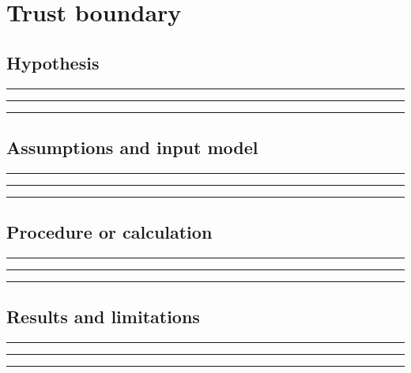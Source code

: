 \documentclass[11pt]{article}
\begin{document}
\section{Trust boundary}

\subsection{Hypothesis}
\noindent\rule{\linewidth}{0.35pt}\par\vspace{0.22in}
\noindent\rule{\linewidth}{0.35pt}\par\vspace{0.22in}
\noindent\rule{\linewidth}{0.35pt}\par\vspace{0.18in}

\subsection{Assumptions and input model}
\noindent\rule{\linewidth}{0.35pt}\par\vspace{0.22in}
\noindent\rule{\linewidth}{0.35pt}\par\vspace{0.22in}
\noindent\rule{\linewidth}{0.35pt}\par\vspace{0.18in}

\subsection{Procedure or calculation}
\noindent\rule{\linewidth}{0.35pt}\par\vspace{0.22in}
\noindent\rule{\linewidth}{0.35pt}\par\vspace{0.22in}
\noindent\rule{\linewidth}{0.35pt}\par\vspace{0.18in}

\subsection{Results and limitations}
\noindent\rule{\linewidth}{0.35pt}\par\vspace{0.22in}
\noindent\rule{\linewidth}{0.35pt}\par\vspace{0.22in}
\noindent\rule{\linewidth}{0.35pt}\par\vspace{0.18in}
\end{document}
